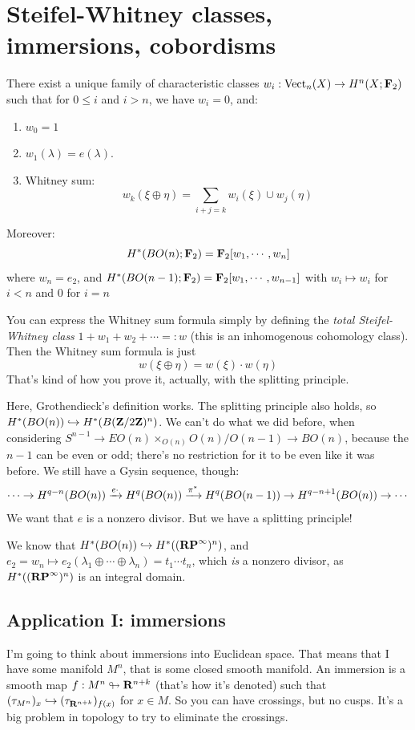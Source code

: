 \section{Steifel-Whitney classes, immersions, cobordisms}
\begin{theorem}
    There exist a unique family of characteristic classes $w_i:\operatorname{Vect}_n(X) \to H^n(X;\mathbf F_2)$ such that for $0\leq i$ and $i>n$, we have $w_i=0$, and:
    \begin{enumerate}
	\item $w_0 = 1$
	\item $w_1(\lambda) = e(\lambda)$.
	\item Whitney sum:
	    \begin{equation*}
		w_k(\xi\oplus\eta) = \sum_{i+j=k} w_i(\xi)\cup w_j(\eta)
	    \end{equation*}
    \end{enumerate}
    Moreover:
    $$
    H^\ast(BO(n);\mathbf F_2) = \mathbf F_2[w_1,\cdots,w_n]
    $$
    where $w_n = e_2$, and $H^\ast(BO(n-1);\mathbf F_2) = \mathbf F_2[w_1,\cdots,w_{n-1}]$ with $w_i\mapsto w_i$ for $i<n$ and $0$ for $i=n$
\end{theorem}
\begin{remark}
    You can express the Whitney sum formula simply by defining the \emph{total Steifel-Whitney class} $1 + w_1 + w_2 + \cdots=:w$ (this is an inhomogenous cohomology class).
    Then the Whitney sum formula is just
    $$
    w(\xi\oplus\eta) = w(\xi)\cdot w(\eta)
    $$
    That's kind of how you prove it, actually, with the splitting principle.
\end{remark}
Here, Grothendieck's definition works.
The splitting principle also holds, so $H^\ast(BO(n))\hookrightarrow H^\ast(B(\mathbf Z/2\mathbf Z)^n)$.
We can't do what we did before, when considering $S^{n-1} \to EO(n)\times_{O(n)} O(n)/O(n-1)\to BO(n)$, because the $n-1$ can be even or odd; there's no restriction for it to be even like it was before.
We still have a Gysin sequence, though:
$$
\cdots\to H^{q-n}(BO(n))\xrightarrow{{e\cdot}} H^q(BO(n)) \xrightarrow{{\pi^\ast}} H^q(BO(n-1)) \to H^{q-n+1}(BO(n))\to\cdots
$$
We want that $e$ is a nonzero divisor.
But we have a splitting principle!

We know that $H^\ast(BO(n)) \hookrightarrow H^\ast((\mathbf{RP}^\infty)^n)$, and $e_2=w_n\mapsto e_2(\lambda_1\oplus\cdots\oplus\lambda_n) = t_1\cdots t_n$, which \emph{is} a nonzero divisor, as $H^\ast((\mathbf{RP}^\infty)^n)$ is an integral domain.
\subsection{Application I: immersions}
I'm going to think about immersions into Euclidean space.
That means that I have some manifold $M^n$, that is some closed smooth manifold.
An immersion is a smooth map $f:M^n\looparrowright \mathbf R^{n+k}$ (that's how it's denoted) such that $(\tau_{M^n})_x \hookrightarrow (\tau_{\mathbf R^{n+k}})_{f(x)}$ for $x\in M$.
So you can have crossings, but no cusps.
It's a big problem in topology to try to eliminate the crossings.

